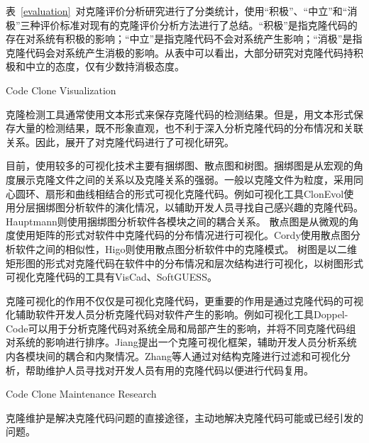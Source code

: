 表~\ref{evaluation}~对克隆评价分析研究进行了分类统计，使用“积极”、“中立”和“消极”三种评价标准对现有的克隆评价分析方法进行了总结。“积极”是指克隆代码的存在对系统有积极的影响；“中立”是指克隆代码不会对系统产生影响；“消极”是指克隆代码会对系统产生消极的影响。从表中可以看出，大部分研究对克隆代码持积极和中立的态度，仅有少数持消极态度。

{Code Clone Visualization}

克隆检测工具通常使用文本形式来保存克隆代码的检测结果。但是，用文本形式保存大量的检测结果，既不形象直观，也不利于深入分析克隆代码的分布情况和关联关系。因此，展开了对克隆代码进行了可视化研究。%

目前，使用较多的可视化技术主要有捆绑图、散点图和树图。捆绑图是从宏观的角度展示克隆文件之间的关系以及克隆关系的强弱。一般以克隆文件为粒度，采用同心圆环、扇形和曲线相结合的形式可视化克隆代码\cite{hanjalic2013clonevol}\cite{hauptmann2012using}\cite{voinea2014visual}。例如可视化工具ClonEvol使用分层捆绑图分析软件的演化情况，以辅助开发人员寻找自己感兴趣的克隆代码\cite{hanjalic2013clonevol}。Hauptmann则使用捆绑图分析软件各模块之间的耦合关系\cite{hauptmann2012using}。
散点图是从微观的角度使用矩阵的形式对软件中克隆代码的分布情况进行可视化\cite{cordy2011exploring}\cite{higo2007method}\cite{livieri2007very}。Cordy使用散点图分析软件之间的相似性\cite{cordy2011exploring}，Higo则使用散点图分析软件中的克隆模式\cite{higo2007method}\cite{livieri2007very}。
树图是以二维矩形图的形式对克隆代码在软件中的分布情况和层次结构进行可视化，以树图形式可视化克隆代码的工具有VisCad\cite{asaduzzaman2011viscad}\cite{uddin2015comprehension}、SoftGUESS\cite{adar2007softguess}。

克隆可视化的作用不仅仅是可视化克隆代码，更重要的作用是通过克隆代码的可视化辅助软件开发人员分析克隆代码对软件产生的影响。例如可视化工具Doppel-Code可以用于分析克隆代码对系统全局和局部产生的影响，并将不同克隆代码组对系统的影响进行排序\cite{forbes2012doppel}。Jiang提出一个克隆可视化框架，辅助开发人员分析系统内各模块间的耦合和内聚情况\cite{jiang2007framework}\cite{jiang2006visualizing}。Zhang等人通过对结构克隆进行过滤和可视化分析，帮助维护人员寻找对开发人员有用的克隆代码以便进行代码复用\cite{zhang2008query}。

{Code Clone Maintenance Research}


克隆维护是解决克隆代码问题的直接途径，主动地解决克隆代码可能或已经引发的问题。%

